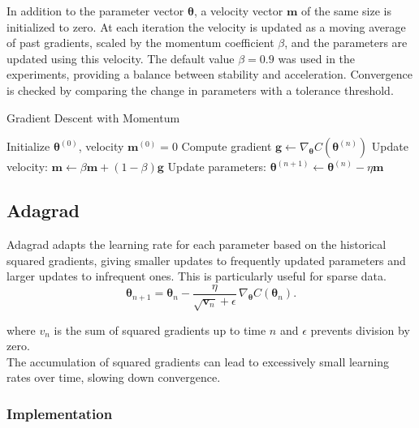 \documentclass[
 reprint,            %
 amsmath,amssymb,
 aps,
]{revtex4-2}
\begin{document}
In addition to the parameter vector $\boldsymbol{\theta}$, a velocity vector $\mathbf{m}$ of the same size is initialized to zero.
At each iteration the velocity is updated as a moving average of past gradients, scaled by the momentum coefficient $\beta$, and the parameters are updated using this velocity.
The default value $\beta=0.9$ was used in the experiments, providing a balance between stability and acceleration.
Convergence is checked by comparing the change in parameters with a tolerance threshold.
\begin{algorithm}[H]
\caption{Gradient Descent with Momentum}
\begin{algorithmic}[1]
\State Initialize $\boldsymbol{\theta}^{(0)}$, velocity $\mathbf{m}^{(0)}=0$
\State Compute gradient $\mathbf{g} \gets \nabla_{\boldsymbol{\theta}} C(\boldsymbol{\theta}^{(n)})$
\State Update velocity: $\mathbf{m} \gets \beta \mathbf{m} + (1-\beta)\mathbf{g}$
\State Update parameters: $\boldsymbol{\theta}^{(n+1)} \gets \boldsymbol{\theta}^{(n)} - \eta \mathbf{m}$
\EndFor
\end{algorithmic}
\end{algorithm}

\subsection{Adagrad}

Adagrad adapts the learning rate for each parameter based on the historical squared gradients, giving smaller updates to frequently updated parameters and larger updates to infrequent ones\cite{hjorthjensen_week37}.
This is particularly useful for sparse data.  
\[
\boldsymbol{\theta}_{n+1} = \boldsymbol{\theta}_n - \frac{\eta}{\sqrt{\boldsymbol{v}_n} + \epsilon} \, \nabla_{\boldsymbol{\theta}} C(\boldsymbol{\theta}_n).
\]

where \(v_n\) is the sum of squared gradients up to time \(n\) and \(\epsilon\) prevents division by zero.\\
The accumulation of squared gradients can lead to excessively small learning rates over time, slowing down convergence. \cite{goodfellow2016}

\subsubsection{Implementation}
\end{document}
